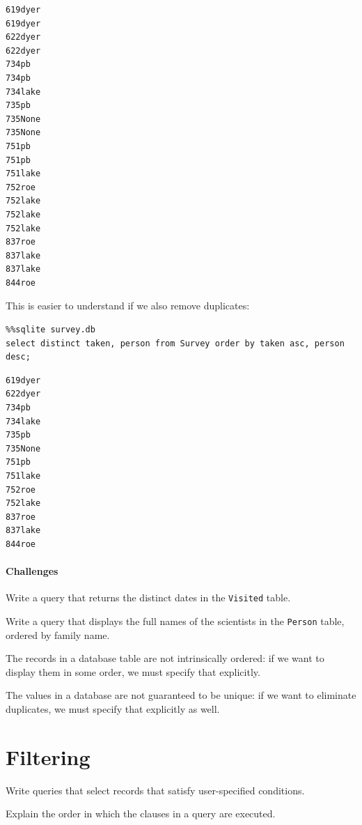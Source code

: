 \documentclass{book}
\begin{document}
\begin{verbatim}
619dyer
619dyer
622dyer
622dyer
734pb
734pb
734lake
735pb
735None
735None
751pb
751pb
751lake
752roe
752lake
752lake
752lake
837roe
837lake
837lake
844roe
\end{verbatim}

This is easier to understand if we also remove duplicates:

\begin{verbatim}
%%sqlite survey.db
select distinct taken, person from Survey order by taken asc, person desc;
\end{verbatim}

\begin{verbatim}
619dyer
622dyer
734pb
734lake
735pb
735None
751pb
751lake
752roe
752lake
837roe
837lake
844roe
\end{verbatim}

\mbox{}\paragraph{Challenges}

\begin{swcenumerate}
\item
  Write a query that returns the distinct dates in the \texttt{Visited}
  table.
\item
  Write a query that displays the full names of the scientists in the
  \texttt{Person} table, ordered by family name.
\end{swcenumerate}

\begin{keypoints}
\begin{swcitemize}
\item
  The records in a database table are not intrinsically ordered: if we
  want to display them in some order, we must specify that explicitly.
\item
  The values in a database are not guaranteed to be unique: if we want
  to eliminate duplicates, we must specify that explicitly as well.
\end{swcitemize}
\end{keypoints}

\section{Filtering}

\begin{objectives}
\begin{swcitemize}
\item
  Write queries that select records that satisfy user-specified
  conditions.
\item
  Explain the order in which the clauses in a query are executed.
\end{swcitemize}
\end{objectives}
\end{document}
